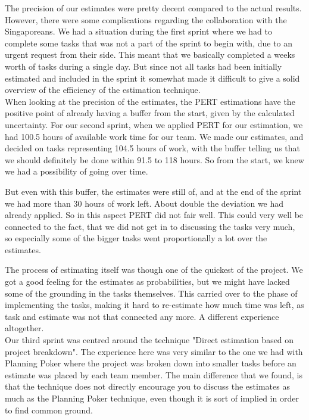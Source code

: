 The precision of our estimates were pretty decent compared to the actual results. However, there were some complications regarding the collaboration with the Singaporeans. We had a situation during the first sprint where we had to complete some tasks that was not a part of the sprint to begin with, due to an urgent request from their side. This meant that we basically completed a weeks worth of tasks during a single day. But since not all tasks had been initially estimated and included in the sprint it somewhat made it difficult to give a solid overview of the efficiency of the estimation technique. \\



When looking at the precision of the estimates, the PERT estimations have the positive point of already having a buffer from the start, given by the calculated uncertainty. For our second sprint, when we applied PERT for our estimation, we had 100.5 hours of available work time for our team. We made our estimates, and decided on tasks representing 104.5 hours of work, with the buffer telling us that we should definitely be done within 91.5 to 118 hours. So from the start, we knew we had a possibility of going over time. \

But even with this buffer, the estimates were still of, and at the end of the sprint we had more than 30 hours of work left. About double the deviation we had already applied. So in this aspect PERT did not fair well. This could very well be connected to the fact, that we did not get in to discussing the tasks very much, so especially some of the bigger tasks went proportionally a lot over the estimates. 

The process of estimating itself was though one of the quickest of the project. We got a good feeling for the estimates as probabilities, but we might have lacked some of the grounding in the tasks themselves. This carried over to the phase of implementing the tasks, making it hard to re-estimate how much time was left, as task and estimate was not that connected any more. A different experience altogether. \\

Our third sprint was centred around the technique "Direct estimation based on project breakdown". The experience here was very similar to the one we had with Planning Poker where the project was broken down into smaller tasks before an estimate was placed by each team member. The main difference that we found, is that the technique does not directly encourage you to discuss the estimates as much as the Planning Poker technique, even though it is sort of implied in order to find common ground.\\

